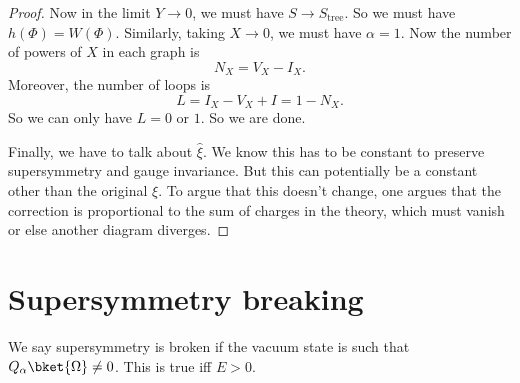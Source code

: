 \documentclass[a4paper]{article}
\begin{document}
\begin{proof}
  Now in the limit $Y \to 0$, we must have $S \to S_{\mathrm{tree}}$. So we must have $h(\Phi) = W(\Phi)$. Similarly, taking $X \to 0$, we must have $\alpha = 1$. Now the number of powers of $X$ in each graph is
  \[
    N_X = V_X - I_X.
  \]
  Moreover, the number of loops is
  \[
    L = I_X - V_X + I = 1 - N_X.
  \]
  So we can only have $L = 0$ or $1$. So we are done.

  Finally, we have to talk about $\hat{\xi}$. We know this has to be constant to preserve supersymmetry and gauge invariance. But this can potentially be a constant other than the original $\xi$. To argue that this doesn't change, one argues that the correction is proportional to the sum of charges in the theory, which must vanish or else another diagram diverges. %
\end{proof}

\section{Supersymmetry breaking}
We say supersymmetry is broken if the vacuum state is such that $Q_\alpha \bket{\Omega} \not= 0$. This is true iff $E > 0$.
\end{document}
